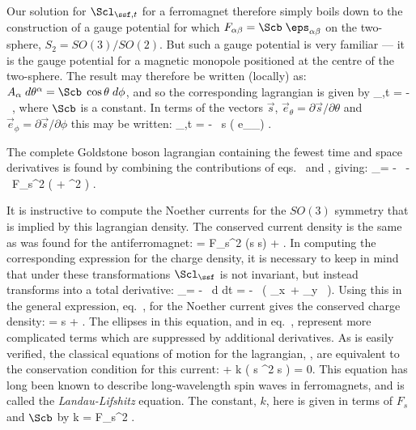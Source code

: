 \documentclass[12pt,epsf]{report}
\begin{document}
Our solution for $\Scl_{\ssf,t}$ for a ferromagnet
therefore simply boils down to the construction of a gauge
potential for which $F_{\alpha\beta} = \Scb \;
\eps_{\alpha\beta}$ on the two-sphere, $S_2 = SO(3)/SO(2)$.
But such a gauge potential is very familiar --- it is the
gauge potential for a magnetic monopole positioned at the
centre of the two-sphere. The result may therefore be
written (locally) as: $A_\alpha \; d\theta^\alpha = \Scb \;
\cos\theta \; 
d\phi$, and so the corresponding lagrangian is given by
%
\eq
\label{ftimeterms}
\Scl_{\ssf,t} = - \, \Scb \; \cos\theta \; \dot\phi, \eeq
%
where $\Scb$ is a constant. In terms of the vectors $\vec
s$, 
$\vec e_\theta = \partial \vec s / \partial \theta$ and
$\vec e_\phi = \partial \vec s / \partial \phi$ this may be
written:
%
\eq
\label{fancyftimeterms}
\Scl_{\ssf,t} = - \, \Scb \; \vec s 
\cdot \Bigl( \vec e_\theta \times {}_\theta \Bigr) .
\eeq

The complete Goldstone boson lagrangian containing the
fewest time and space derivatives is found by combining the
contributions of eqs.~ and
, giving:
%
\eq
\label{ftotalterms}
\Scl_\ssf = - \, \Scb \; \cos\theta \; 
\dot\phi - \, {F_s^2 } \; \Bigl(
\del\theta \cdot \del \theta + \sin^2 
\theta \; \del \phi \cdot \del \phi
\Bigr) .
\eeq

It is instructive to compute the Noether currents for the
$SO(3)$ symmetry that is implied by this lagrangian
density. The conserved current density is the same as was
found for the antiferromagnet:
\eq
\label{conscurrentdens}
\vec\bfj = F_s^2 \; (\vec s \times 
\del \vec s) + \cdots . \eeq
%
In computing the corresponding expression for the charge
density, it is necessary to keep in mind that under these
transformations 
$\Scl_\ssf$ is not invariant, but instead transforms into a
total derivative:   
%
\eq
\label{totderivvariationofl}
\delta \Scl_\ssf = - \, {d \Omega \over dt} 
= - \, { \Scb \over \sin \theta} \;
\Bigl( \omega_x \,\cos\phi + \omega_y 
\, \sin\phi \Bigr). \eeq
%
Using this in the general expression, eq.~,
for the Noether current gives the conserved charge density: 
%
\eq
\label{conschargedensityforfm}
\vec \rho = \Scb \; \vec s + \cdots .
\eeq
%
The ellipses in this equation, and in
eq.~, represent more complicated
terms which are suppressed by additional derivatives. As is
easily verified, the classical equations of motion for the
lagrangian, , are equivalent to the
conservation condition for this current:
%
\eq
\label{landaulifshitzeq}
 + k \; \Bigl( \vec s \times 
\del^2 \vec s \Bigr) = 0.
\eeq
%
This equation has long been known to describe
long-wavelength spin waves in ferromagnets, and is called
the {\em Landau-Lifshitz} equation. The constant, $k$, here
is given in terms of $F_s$ and $\Scb$ by 
%
\eq
\label{lleqconst}
k = {F_s^2 \over \Scb}.
\eeq
\end{document}
